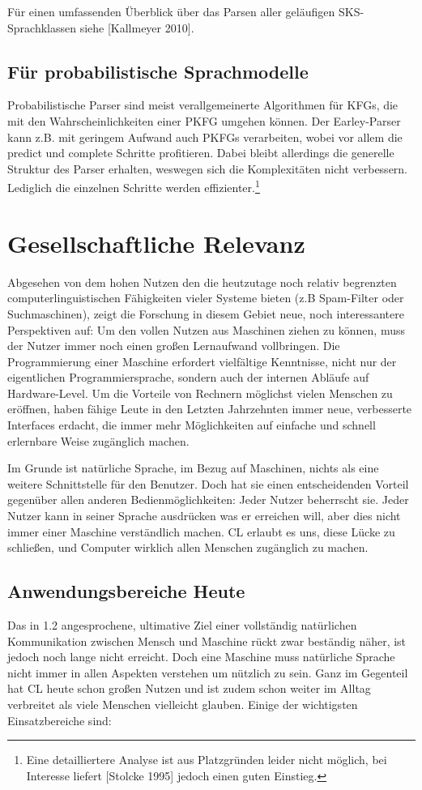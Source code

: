 \documentclass[12pt,a4paper]{article}
\theoremstyle{definition}
\begin{document}
		Für einen umfassenden Überblick über das Parsen aller geläufigen SKS-Sprachklassen siehe [Kallmeyer 2010].
	
	\subsection{Für probabilistische Sprachmodelle}
		Probabilistische Parser sind meist verallgemeinerte Algorithmen für KFGs, die mit den Wahrscheinlichkeiten einer PKFG umgehen können. Der Earley-Parser kann z.B. mit geringem Aufwand auch PKFGs verarbeiten, wobei vor allem die predict und complete Schritte profitieren. Dabei bleibt allerdings die generelle Struktur des Parser erhalten, weswegen sich die Komplexitäten nicht verbessern. Lediglich die einzelnen Schritte werden effizienter.\footnote{Eine detailliertere Analyse ist aus Platzgründen leider nicht möglich, bei Interesse liefert [Stolcke 1995] jedoch einen guten Einstieg.}

\section{Gesellschaftliche Relevanz}
	Abgesehen von dem hohen Nutzen den die heutzutage noch relativ begrenzten computerlinguistischen Fähigkeiten vieler Systeme bieten (z.B Spam-Filter oder Suchmaschinen), zeigt die Forschung in diesem Gebiet neue, noch interessantere Perspektiven auf: Um den vollen Nutzen aus Maschinen ziehen zu können, muss der Nutzer immer noch einen großen Lernaufwand vollbringen. Die Programmierung einer Maschine erfordert vielfältige Kenntnisse, nicht nur der eigentlichen Programmiersprache, sondern auch der internen Abläufe auf Hardware-Level. Um die Vorteile von Rechnern möglichst vielen Menschen zu eröffnen, haben fähige Leute in den Letzten Jahrzehnten immer neue, verbesserte Interfaces erdacht, die immer mehr Möglichkeiten auf einfache und schnell erlernbare Weise zugänglich machen.

	Im Grunde ist natürliche Sprache, im Bezug auf Maschinen, nichts als eine weitere Schnittstelle für den Benutzer. Doch hat sie einen entscheidenden Vorteil gegenüber allen anderen Bedienmöglichkeiten: Jeder Nutzer beherrscht sie. Jeder Nutzer kann in seiner Sprache ausdrücken was er erreichen will, aber dies nicht immer einer Maschine verständlich machen. CL erlaubt es uns, diese Lücke zu schließen, und Computer wirklich allen Menschen zugänglich zu machen.
	
	\subsection{Anwendungsbereiche Heute}
		Das in 1.2 angesprochene, ultimative Ziel einer vollständig natürlichen Kommunikation zwischen Mensch und Maschine rückt zwar beständig näher, ist jedoch noch lange nicht erreicht. Doch eine Maschine muss natürliche Sprache nicht immer in allen Aspekten verstehen um nützlich zu sein. Ganz im Gegenteil hat CL heute schon großen Nutzen und ist zudem schon weiter im Alltag verbreitet als viele Menschen vielleicht glauben. Einige der wichtigsten Einsatzbereiche sind:
\end{document}
